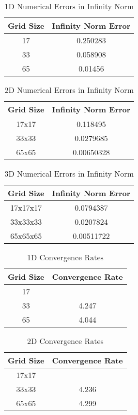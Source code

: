 \begin{table}[h!]
\centering
\begin{tabular}{|c|c|}
\hline
Grid Size & Infinity Norm Error \\
\hline
17 & 0.250283 \\
33 & 0.058908 \\
65 & 0.01456 \\
\hline
\end{tabular}
\caption{1D Numerical Errors in Infinity Norm}
\label{err_1D_b}
\end{table}

\begin{table}[h!]
\centering
\begin{tabular}{|c|c|}
\hline
Grid Size & Infinity Norm Error \\
\hline
17x17 & 0.118495 \\
33x33 & 0.0279685 \\
65x65 & 0.00650328 \\
\hline
\end{tabular}
\caption{2D Numerical Errors in Infinity Norm}
\label{err_2D_b}
\end{table}

\begin{table}[h!]
\centering
\begin{tabular}{|c|c|}
\hline
Grid Size & Infinity Norm Error \\
\hline
17x17x17 & 0.0794387 \\
33x33x33 & 0.0207824 \\
65x65x65 & 0.00511722 \\
\hline
\end{tabular}
\caption{3D Numerical Errors in Infinity Norm}
\label{err_3D_b}
\end{table}

\begin{table}[h!]
\centering
\begin{tabular}{|c|c|}
\hline
Grid Size & Convergence Rate \\
\hline
17 &  \\
33 & 4.247 \\
65 & 4.044 \\
\hline
\end{tabular}
\caption{1D Convergence Rates}
\label{rate_1D_b}
\end{table}

\begin{table}[h!]
\centering
\begin{tabular}{|c|c|}
\hline
Grid Size & Convergence Rate \\
\hline
17x17 &  \\
33x33 & 4.236 \\
65x65 & 4.299 \\
\hline
\end{tabular}
\caption{2D Convergence Rates}
\label{rate_2D_b}
\end{table}

